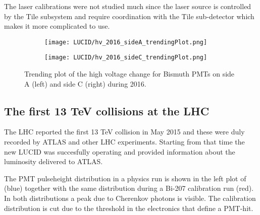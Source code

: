 The laser calibrations were not studied much since the laser source is controlled by the Tile subsystem and require 
coordination with the Tile sub-detector which makes it more complicated to use.

\begin{figure}
\centering
\begin{subfigure}{.5\textwidth}
  \centering
  \texttt{[image: LUCID/hv\_2016\_sideA\_trendingPlot.png]}
  \label{fig:sub3}
\end{subfigure}%
\begin{subfigure}{.5\textwidth}
  \centering
  \texttt{[image: LUCID/hv\_2016\_sideC\_trendingPlot.png]}
  \label{fig:sub4}
\end{subfigure}
\caption{Trending plot of the high voltage change for Bismuth PMTs on side A (left) and side C (right) during 2016.}
\label{fig:hv_trending_plot_2016}
\end{figure}





\subsection{The first 13 TeV collisions at the LHC}
\label{sec:physics}

The LHC reported the first 13 TeV \pp collision in May 2015 and these were  duly recorded by ATLAS and other LHC experiments. 
Starting from that time the new LUCID was succesfully operating and provided information about the 
luminosity delivered to ATLAS. 

The PMT pulseheight distribution in a physics run is shown in the left plot of  (blue) 
together with the same distribution 
during a Bi-207 calibration run (red). In both distributions a peak due to Cherenkov photons is visible. The 
calibration distribution is cut due to the threshold in the electronics that define a PMT-hit.

